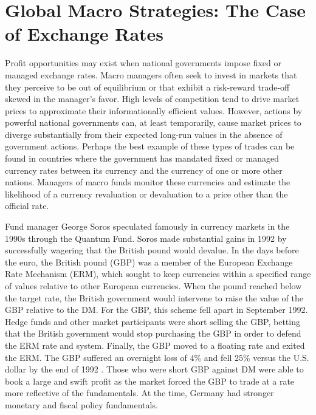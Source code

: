 \documentclass[11pt]{article}
\begin{document}
\section*{Global Macro Strategies: The Case of Exchange Rates}
Profit opportunities may exist when national governments impose fixed or managed exchange rates. Macro managers often seek to invest in markets that they perceive to be out of equilibrium or that exhibit a risk-reward trade-off skewed in the manager's favor. High levels of competition tend to drive market prices to approximate their informationally efficient values. However, actions by powerful national governments can, at least temporarily, cause market prices to diverge substantially from their expected long-run values in the absence of government actions. Perhaps the best example of these types of trades can be found in countries where the government has mandated fixed or managed currency rates between its currency and the currency of one or more other nations. Managers of macro funds monitor these currencies and estimate the likelihood of a currency revaluation or devaluation to a price other than the official rate.

Fund manager George Soros speculated famously in currency markets in the 1990s through the Quantum Fund. Soros made substantial gains in 1992 by successfully wagering that the British pound would devalue. In the days before the euro, the British pound (GBP) was a member of the European Exchange Rate Mechanism (ERM), which sought to keep currencies within a specified range of values relative to other European currencies. When the pound reached below the target rate, the British government would intervene to raise the value of the GBP relative to the DM. For the GBP, this scheme fell apart in September 1992. Hedge funds and other market participants were short selling the GBP, betting that the British government would stop purchasing the GBP in order to defend the ERM rate and system. Finally, the GBP moved to a floating rate and exited the ERM. The GBP suffered an overnight loss of $4 \%$ and fell $25 \%$ versus the U.S. dollar by the end of 1992 . Those who were short GBP against DM were able to book a large and swift profit as the market forced the GBP to trade at a rate more reflective of the fundamentals. At the time, Germany had stronger monetary and fiscal policy fundamentals.
\end{document}
